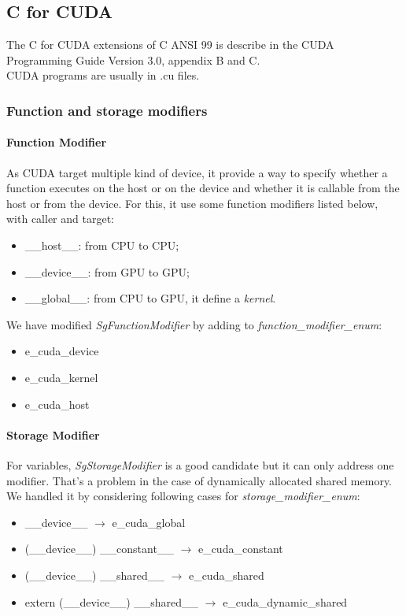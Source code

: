 		\subsection{C for CUDA}
		
			The C for CUDA extensions of C ANSI 99 is describe in the CUDA Programming Guide Version 3.0, appendix B and C.\\
			CUDA programs are usually in .cu files.
		
			\subsubsection{Function and storage modifiers}

				\paragraph{Function Modifier}

As CUDA target multiple kind of device, it provide a way to specify whether a function executes on the host or on the device and whether it is
callable from the host or from the device. For this, it use some function modifiers listed below, with caller and target:
\begin{itemize}
	\item \_\_host\_\_: from CPU to CPU;
	\item \_\_device\_\_: from GPU to GPU;
	\item \_\_global\_\_: from CPU to GPU, it define a \emph{kernel}.
\end{itemize}
We have modified \emph{SgFunctionModifier} by adding to \emph{function\_modifier\_enum}:
\begin{itemize}
	\item e\_cuda\_device
	\item e\_cuda\_kernel
	\item e\_cuda\_host
\end{itemize}

				\paragraph{Storage Modifier}	

For variables, \emph{SgStorageModifier} is a good candidate but it can only address one modifier. That's a problem in the case of dynamically allocated shared memory.
We handled it by considering following cases for \emph{storage\_modifier\_enum}:
		
\begin{itemize}
	\item \_\_device\_\_ $\rightarrow$ e\_cuda\_global
	\item (\_\_device\_\_) \_\_constant\_\_ $\rightarrow$ e\_cuda\_constant
	\item (\_\_device\_\_) \_\_shared\_\_ $\rightarrow$ e\_cuda\_shared
	\item extern (\_\_device\_\_) \_\_shared\_\_ $\rightarrow$ e\_cuda\_dynamic\_shared
\end{itemize}

